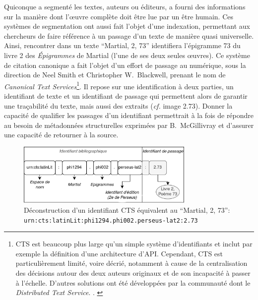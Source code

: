 Quiconque a segmenté les textes, auteurs ou éditeurs, a fourni des informations sur la manière dont l'œuvre complète doit être lue par un être humain. Ces systèmes de segmentation ont aussi fait l'objet d'une indexation, permettant aux chercheurs de faire référence à un passage d'un texte de manière quasi universelle. Ainsi, rencontrer dans un texte \enquote{Martial, 2, 73} identifiera l'épigramme 73 du livre 2 des \textit{Épigrammes} de Martial (l'une de ses deux seules œuvres). Ce système de citation canonique a fait l'objet d'un effort de passage au numérique, sous la direction de Neel Smith et Christopher W.~Blackwell, prenant le nom de \textit{Canonical Text Services}\footnote{CTS est beaucoup plus large qu'un simple système d'identifiants et inclut par exemple la définition d'une architecture d'API. Cependant, CTS est particulièrement limité, voire décrié, notamment à cause de la centralisation des décisions autour des deux auteurs originaux et de son incapacité à passer à l'échelle. D'autres solutions ont été développées par la communauté dont le \textit{Distributed Text Service}. \textcite{blackwell2019cite}. \textcite{almas_distributed_2021}}. Il repose sur une identification à deux parties, un identifiant de texte et un identifiant de passage qui permettent alors de garantir une traçabilité du texte, mais aussi des extraits (\textit{cf.} image 2.73). Donner la capacité de qualifier les passages d'un identifiant permettrait à la fois de répondre au besoin de métadonnées structurelles exprimées par B.~McGillivray et d'assurer une capacité de retourner à la source.

\begin{figure}
    \centering
    \includegraphics[height=3cm]{figures/chap1/part2/cts-urn.drawio.png}
    \caption{Déconstruction d'un identifiant CTS équivalent au \enquote{Martial, 2, 73}: \texttt{urn:cts:latinLit:phi1294.phi002.perseus-lat2:2.73}}
    \label{fig:chap1:cts_urn}
\end{figure}


